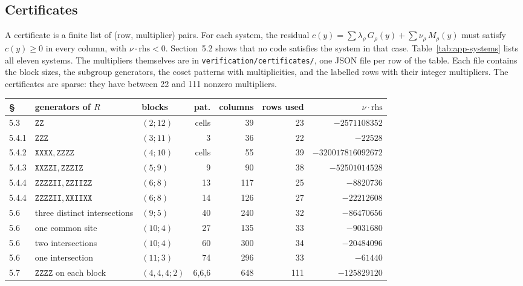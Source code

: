 \documentclass[11pt]{article}
\newcommand{\rhs}{\mathrm{rhs}}
\begin{document}
\subsection{Certificates}\label{app:certificates}

A certificate is a finite list of (row, multiplier) pairs. For each system, the residual \(c(y)=\sum\lambda_\rho\,G_\rho(y)+\sum\nu_\rho\,M_\rho(y)\) must satisfy \(c(y)\geq0\) in every column, with \(\nu\cdot\rhs<0\). Section~5.2 shows that no code satisfies the system in that case. Table~\ref{tab:app-systems} lists all eleven systems. The multipliers themselves are in \texttt{verification/certificates/}, one JSON file per row of the table. Each file contains the block sizes, the subgroup generators, the coset patterns with multiplicities, and the labelled rows with their integer multipliers. The certificates are sparse: they have between 22 and 111 nonzero multipliers.

{\small
\setlength{\tabcolsep}{3pt}
\begin{center}
\label{tab:app-systems}
\begin{tabularx}{\linewidth}{@{}l>{\raggedright\arraybackslash}Xlrrrr@{}}
\toprule
\S & generators of \(R\) & blocks & pat. & columns & rows used & \(\nu\cdot\rhs\) \\
\midrule
5.3 & \(\mathtt{ZZ}\) & \((2;12)\) & cells & 39 & 23 & \(-2571108352\) \\
5.4.1 & \(\mathtt{ZZZ}\) & \((3;11)\) & 3 & 36 & 22 & \(-22528\) \\
5.4.2 & \(\mathtt{XXXX},\mathtt{ZZZZ}\) & \((4;10)\) & cells & 55 & 39 & \(-320017816092672\) \\
5.4.3 & \(\mathtt{XXZZI},\mathtt{ZZZIZ}\) & \((5;9)\) & 9 & 90 & 38 & \(-52501014528\) \\
5.4.4 & \(\mathtt{ZZZZII},\mathtt{ZZIIZZ}\) & \((6;8)\) & 13 & 117 & 25 & \(-8820736\) \\
5.4.4 & \(\mathtt{ZZZZII},\mathtt{XXIIXX}\) & \((6;8)\) & 14 & 126 & 27 & \(-22212608\) \\
5.6 & three distinct intersections & \((9;5)\) & 40 & 240 & 32 & \(-86470656\) \\
5.6 & one common site & \((10;4)\) & 27 & 135 & 33 & \(-9031680\) \\
5.6 & two intersections & \((10;4)\) & 60 & 300 & 34 & \(-20484096\) \\
5.6 & one intersection & \((11;3)\) & 74 & 296 & 33 & \(-61440\) \\
5.7 & \(\mathtt{ZZZZ}\) on each block & \((4,4,4;2)\) & 6,6,6 & 648 & 111 & \(-125829120\) \\
\bottomrule
\end{tabularx}
\end{center}
}
\end{document}
